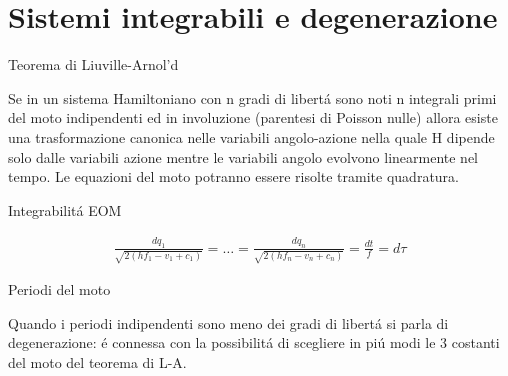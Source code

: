 \section{Sistemi integrabili e degenerazione}

\begin{frame}{Teorema di Liuville-Arnol'd}

Se in un sistema Hamiltoniano con n gradi di libert\'a sono noti n integrali primi del moto indipendenti ed in involuzione (parentesi di Poisson nulle) allora esiste una trasformazione canonica nelle variabili angolo-azione nella quale H dipende solo dalle variabili azione mentre le variabili angolo evolvono linearmente nel tempo. Le equazioni del moto potranno essere risolte tramite quadratura.


\end{frame}

\begin{wordonframe}{Integrabilit\'a EOM}

\begin{align*}
\frac{dq_1}{\sqrt{2(hf_1-v_1+c_1)}}=\ldots=\frac{dq_n}{\sqrt{2(hf_n-v_n+c_n)}}=\frac{dt}{f}=d\tau
\end{align*}

\end{wordonframe}

\begin{frame}{Periodi del moto}

Quando i periodi indipendenti sono meno dei gradi di libert\'a si parla di degenerazione: \'e connessa con la possibilit\'a di scegliere in pi\'u modi le 3 costanti del moto del teorema di L-A.

\end{frame}
